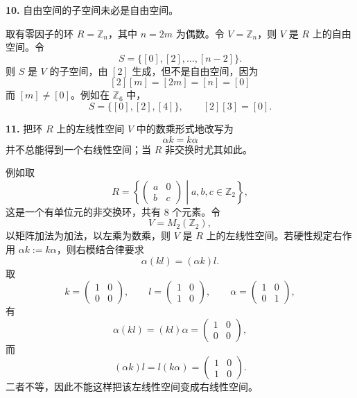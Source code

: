 \textbf{10.} 自由空间的子空间未必是自由空间。

取有零因子的环 $R=\mathbb Z_n$，其中 $n=2m$ 为偶数。令 $V=\mathbb Z_n$，则 $V$ 是 $R$ 上的自由空间。令
\[
S=\{[0],[2],\ldots,[n-2]\}.
\]
则 $S$ 是 $V$ 的子空间，由 $[2]$ 生成，但不是自由空间，因为
\[
[2][m]=[2m]=[n]=[0]
\]
而 $[m]\ne[0]$。例如在 $\mathbb Z_6$ 中，
\[
S=\{[0],[2],[4]\},
\qquad [2][3]=[0].
\]

\textbf{11.} 把环 $R$ 上的左线性空间 $V$ 中的数乘形式地改写为
\[
\alpha k=k\alpha
\]
并不总能得到一个右线性空间；当 $R$ 非交换时尤其如此。

例如取
\[
R=\left\{\begin{pmatrix}a&0\\b&c\end{pmatrix}\middle|a,b,c\in\mathbb Z_2\right\},
\]
这是一个有单位元的非交换环，共有 $8$ 个元素。令
\[
V=M_2(\mathbb Z_2),
\]
以矩阵加法为加法，以左乘为数乘，则 $V$ 是 $R$ 上的左线性空间。若硬性规定右作用 $\alpha k:=k\alpha$，则右模结合律要求
\[
\alpha(kl)=(\alpha k)l.
\]
取
\[
k=\begin{pmatrix}1&0\\0&0\end{pmatrix},
\qquad
l=\begin{pmatrix}1&0\\1&0\end{pmatrix},
\qquad
\alpha=\begin{pmatrix}1&0\\0&1\end{pmatrix},
\]
有
\[
\alpha(kl)=(kl)\alpha=\begin{pmatrix}1&0\\0&0\end{pmatrix},
\]
而
\[
(\alpha k)l=l(k\alpha)=\begin{pmatrix}1&0\\1&0\end{pmatrix}.
\]
二者不等，因此不能这样把该左线性空间变成右线性空间。
